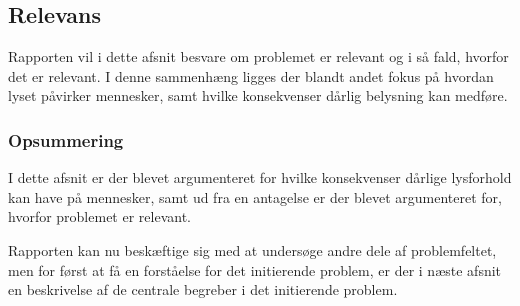 \subsection{Relevans}
Rapporten vil i dette afsnit besvare om problemet er relevant og i så fald, hvorfor det er relevant. I denne sammenhæng ligges der blandt andet fokus på hvordan lyset påvirker mennesker, samt hvilke konsekvenser dårlig belysning kan medføre. 





\subsubsection*{Opsummering}
I dette afsnit er der blevet argumenteret for hvilke konsekvenser dårlige lysforhold kan have på mennesker, samt ud fra en antagelse er der blevet argumenteret for, hvorfor problemet er relevant. 

Rapporten kan nu beskæftige sig med at undersøge andre dele af problemfeltet, men for først at få en forståelse for det initierende problem, er der i næste afsnit en beskrivelse af de centrale begreber i det initierende problem.
